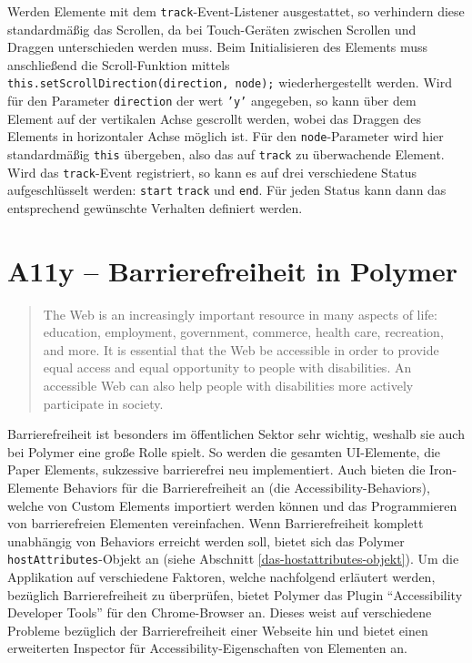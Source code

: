 Werden Elemente mit dem \texttt{track}-Event-Listener ausgestattet, so verhindern diese standardmäßig das Scrollen, da bei Touch-Geräten zwischen Scrollen und Draggen unterschieden werden muss. Beim Initialisieren des Elements muss anschließend die Scroll-Funktion mittels \texttt{this.setScrollDirection(direction,\ node);} wiederhergestellt werden. Wird für den Parameter \texttt{direction} der wert \texttt{'y'} angegeben, so kann über dem Element auf der vertikalen Achse gescrollt werden, wobei das Draggen des Elements in horizontaler Achse möglich ist. Für den \texttt{node}-Parameter wird hier standardmäßig \texttt{this} übergeben, also das auf \texttt{track} zu überwachende Element. Wird das \texttt{track}-Event registriert, so kann es auf drei verschiedene Status aufgeschlüsselt werden: \texttt{start} \texttt{track} und \texttt{end}. Für jeden Status kann dann das entsprechend gewünschte Verhalten definiert werden.


\section{A11y -- Barrierefreiheit in Polymer}\label{a11y---barrierefreiheit-in-polymer}

\begin{quote}
The Web is an increasingly important resource in many aspects of life: education, employment, government, commerce, health care, recreation, and more. It is essential that the Web be accessible in order to provide equal access and equal opportunity to people with disabilities. An accessible Web can also help people with disabilities more actively participate in society. \cite{citeulike:13915280}
\end{quote}

Barrierefreiheit ist besonders im öffentlichen Sektor sehr wichtig, weshalb sie auch bei Polymer eine große Rolle spielt. So werden die gesamten \ac{UI}-Elemente, die Paper Elements, sukzessive barrierefrei neu implementiert. Auch bieten die Iron-Elemente Behaviors für die Barrierefreiheit an (die Accessibility-Behaviors), welche von Custom Elements importiert werden können und das Programmieren von barrierefreien Elementen vereinfachen. Wenn Barrierefreiheit komplett unabhängig von Behaviors erreicht werden soll, bietet sich das Polymer \texttt{hostAttributes}-Objekt an (siehe Abschnitt \ref{das-hostattributes-objekt}). Um die Applikation auf verschiedene Faktoren, welche nachfolgend erläutert werden, bezüglich Barrierefreiheit zu überprüfen, bietet Polymer das Plugin ``Accessibility \mbox{Developer} Tools'' für den Chrome-Browser an. Dieses weist auf verschiedene Probleme bezüglich der Barrierefreiheit einer Webseite hin und bietet einen erweiterten Inspector für Accessibility-Eigenschaften von Elementen an. \cite{citeulike:13915273}


